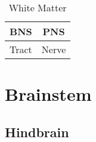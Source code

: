 \begin{table}[htbp]
    \centering
    \begin{tabular}{cc}
        \toprule
        \textbf{BNS} & \textbf{PNS} \\ \midrule
        Tract        & Nerve        \\
        \bottomrule
    \end{tabular}
    \caption{White Matter}\label{tab:}
\end{table}

\section{Brainstem}

\subsection{Hindbrain}

